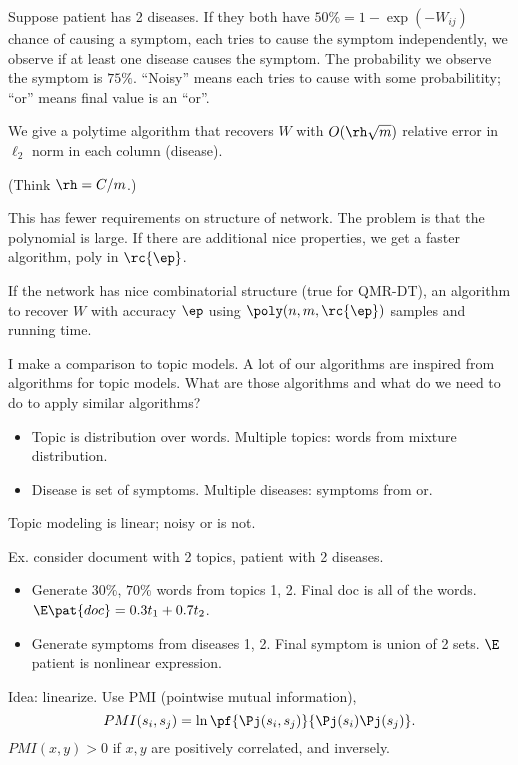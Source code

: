 
Suppose patient has 2 diseases. If they both have $50\%=1-\exp(-W_{ij})$ chance of causing a symptom, each tries to cause the symptom independently, we observe if at least one disease causes the symptom. The probability we observe the symptom is $75\%$. ``Noisy'' means each tries to cause with some probabilitity; ``or'' means final value is an ``or''.
\begin{thm}
We give a polytime algorithm that recovers $W$ with $O(\rh\sqrt m)$ relative error in $\ell_2$ norm in each column (disease). 
\end{thm} 
(Think $\rh=C/m$.)

This has fewer requirements on structure of network. The problem is that the polynomial is large. If there are additional nice properties, we get a faster algorithm, poly in $\rc{\ep}$. 
\begin{thm}
If the network has nice combinatorial structure (true for QMR-DT), an algorithm to recover $W$ with accuracy $\ep$ using $\poly(n,m,\rc{\ep})$ samples and running time.
\end{thm}


I make a comparison to topic models. A lot of our algorithms are inspired from algorithms for topic models. What are those algorithms and what do we need to do to apply similar algorithms? 
\begin{itemize}
\item
Topic is distribution over words. Multiple topics: words from mixture distribution. 
\item
Disease is set of symptoms. Multiple diseases: symptoms from or.
\end{itemize}
Topic modeling is linear; noisy or is not. 

Ex. consider document with 2 topics, patient with 2 diseases.
\begin{itemize}
\item
Generate $30\%$, $70\%$ words from topics 1, 2. Final doc is all of the words. $\E\pat{doc}=0.3t_1+0.7t_2$.
\item
Generate symptoms from diseases 1, 2. Final symptom is union of 2 sets. $\E$ patient is nonlinear expression. 
\end{itemize}

Idea: linearize. Use PMI (pointwise mutual information),
$$
PMI(s_i,s_j) = \ln \pf{\Pj(s_i,s_j)}{\Pj(s_i)\Pj(s_j)}.
$$
$PMI(x,y)>0$ if $x,y$ are positively correlated, and inversely.

